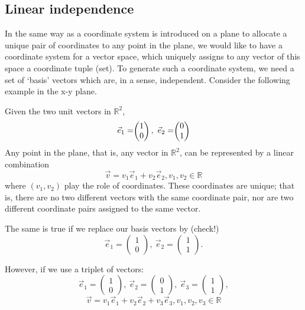 \documentclass[
  letterpaper,
  DIV=11,
  numbers=noendperiod]{scrartcl}
\theoremstyle{remark}
\begin{document}
\subsection{Linear independence}\label{linear-independence}

In the same way as a coordinate system is introduced on a plane to
allocate a unique pair of coordinates to any point in the plane, we
would like to have a coordinate system for a vector space, which
uniquely assigns to any vector of this space a coordinate tuple (set).
To generate such a coordinate system, we need a set of `basis' vectors
which are, in a sense, independent. Consider the following example in
the x-y plane.

Given the two unit vectors in \(\mathbb{R}^2\),
\[\vec{e}_1 = \scriptstyle \begin{pmatrix}   1 \\ 0  \end{pmatrix} \textstyle, \ \vec{e}_2= \scriptstyle \begin{pmatrix}   0 \\ 1  \end{pmatrix} \textstyle\]
Any point in the plane, that is, any vector in \(\mathbb{R}^2\), can be
represented by a linear combination
\[\vec{v } = v_1  \vec{e}_1  + v_2  \vec{e}_2,  v_1,v_2 \in \mathbb{R}\]
where \((v_1,v_2)\) play the role of coordinates. These coordinates are
unique; that is, there are no two different vectors with the same
coordinate pair, nor are two different coordinate pairs assigned to the
same vector.

The same is true if we replace our basis vectors by (check!)
\[\vec{e}_1 = \scriptstyle \begin{pmatrix}   1 \\ 0  \end{pmatrix} \textstyle, \ \vec{e}_2= \scriptstyle \begin{pmatrix}   1 \\ 1  \end{pmatrix} \textstyle .\]

However, if we use a triplet of vectors:
\[\vec{e}_1 = \scriptstyle \begin{pmatrix}   1 \\ 0  \end{pmatrix} \textstyle, \ \vec{e}_2= \scriptstyle \begin{pmatrix}   0 \\ 1  \end{pmatrix} \textstyle,  \ \vec{e}_3= \scriptstyle \begin{pmatrix}   1 \\ 1  \end{pmatrix} \textstyle ,\]
\[\vec{v } = v_1  \vec{e}_1  + v_2  \vec{e}_2 + v_3  \vec{e}_3 ,  v_1,v_2,v_3 \in \mathbb{R}\]
\end{document}
